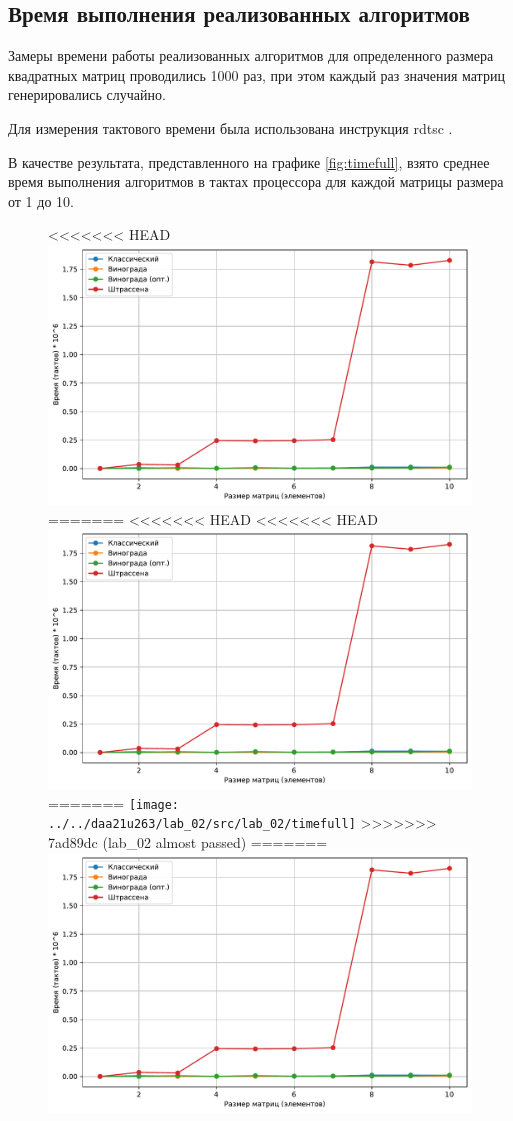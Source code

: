 \newpage

\subsection{Время выполнения реализованных алгоритмов}
Замеры времени работы реализованных алгоритмов для определенного размера квадратных матриц проводились 1000 раз, при этом каждый раз значения матриц генерировались случайно.

Для измерения тактового времени была использована инструкция rdtsc \cite{microsoft_rdtsc}.

В качестве результата, представленного на графике \ref{fig:timefull}, взято среднее время выполнения алгоритмов в тактах процессора для каждой матрицы размера от 1 до 10.

\begin{figure}
	\centering
<<<<<<< HEAD
	\includegraphics[width=0.9\linewidth]{../src/lab_02/timefull}
=======
<<<<<<< HEAD
<<<<<<< HEAD
	\includegraphics[width=0.9\linewidth]{../src/lab_02/timefull}
=======
	\texttt{[image: ../../daa21u263/lab\_02/src/lab\_02/timefull]}
>>>>>>> 7ad89dc (lab_02 almost passed)
=======
	\includegraphics[width=0.9\linewidth]{../src/lab_02/timefull}

\end{figure}
